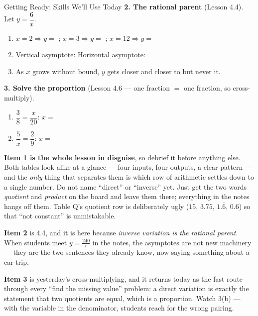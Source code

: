 \documentclass[10pt]{article}
\begin{document}
\begin{notesbox}{Getting Ready: Skills We'll Use Today}
\vspace{5pt}
\textbf{2. The rational parent} (Lesson 4.4). Let $y=\dfrac{6}{x}$.
\begin{enumerate}[label=(\alph*), leftmargin=2.1em, itemsep=3pt]
  \item $x=2 \Rightarrow y=$ ; \quad $x=3 \Rightarrow y=$ ; \quad
        $x=12 \Rightarrow y=$ 
  \item Vertical asymptote:  \qquad Horizontal asymptote: 
  \item As $x$ grows without bound, $y$ gets closer and closer to  but never
         it.
\end{enumerate}

\vspace{5pt}
\textbf{3. Solve the proportion} (Lesson 4.6 --- one fraction $=$ one fraction, so cross-multiply).
\begin{enumerate}[label=(\alph*), leftmargin=2.1em, itemsep=3pt]
  \item $\dfrac{3}{8}=\dfrac{x}{20}$: \quad $x=$ 
  \item $\dfrac{5}{x}=\dfrac{2}{9}$: \quad $x=$ 
\end{enumerate}
\end{notesbox}

\begin{teachernote}
\textbf{Item 1 is the whole lesson in disguise}, so debrief it before anything else. Both tables look
alike at a glance --- four inputs, four outputs, a clear pattern --- and the \emph{only} thing that
separates them is which row of arithmetic settles down to a single number. Do not name ``direct'' or
``inverse'' yet. Just get the two words \emph{quotient} and \emph{product} on the board and leave them
there; everything in the notes hangs off them. Table Q's quotient row is deliberately ugly
($15$, $3.75$, $1.\overline{6}$, $0.6$) so that ``not constant'' is unmistakable.

\vspace{3pt}
\textbf{Item 2} is 4.4, and it is here because \emph{inverse variation is the rational parent}. When
students meet $y=\frac{240}{r}$ in the notes, the asymptotes are not new machinery --- they are the two
sentences they already know, now saying something about a car trip.

\vspace{3pt}
\textbf{Item 3} is yesterday's cross-multiplying, and it returns today as the fast route through every
``find the missing value'' problem: a direct variation is exactly the statement that two quotients are
equal, which is a proportion. Watch 3(b) --- with the variable in the denominator, students reach for
the wrong pairing.
\end{teachernote}
\end{document}
